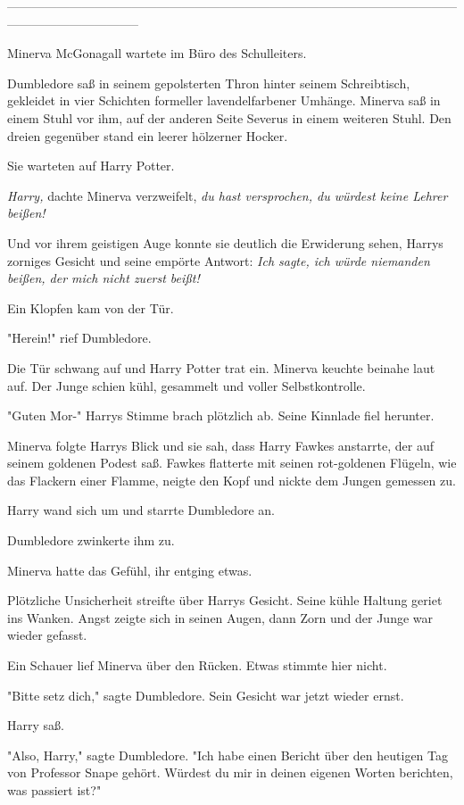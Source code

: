 {--------------------------------------------------------------------------------------------------------------------------------------------

Minerva McGonagall wartete im Büro des Schulleiters.

Dumbledore saß in seinem gepolsterten Thron hinter seinem Schreibtisch, gekleidet in vier Schichten formeller lavendelfarbener Umhänge. Minerva saß in einem Stuhl vor ihm, auf der anderen Seite Severus in einem weiteren Stuhl. Den dreien gegenüber stand ein leerer hölzerner Hocker.

Sie warteten auf Harry Potter.

\emph{Harry,} dachte Minerva verzweifelt, \emph{du hast versprochen, du würdest keine Lehrer beißen!}

Und vor ihrem geistigen Auge konnte sie deutlich die Erwiderung sehen, Harrys zorniges Gesicht und seine empörte Antwort: \emph{Ich sagte, ich würde niemanden beißen, der mich nicht zuerst beißt!}

Ein Klopfen kam von der Tür.

"Herein!" rief Dumbledore.

Die Tür schwang auf und Harry Potter trat ein. Minerva keuchte beinahe laut auf. Der Junge schien kühl, gesammelt und voller Selbstkontrolle.

"Guten Mor-" Harrys Stimme brach plötzlich ab. Seine Kinnlade fiel herunter.

Minerva folgte Harrys Blick und sie sah, dass Harry Fawkes anstarrte, der auf seinem goldenen Podest saß. Fawkes flatterte mit seinen rot-goldenen Flügeln, wie das Flackern einer Flamme, neigte den Kopf und nickte dem Jungen gemessen zu.

Harry wand sich um und starrte Dumbledore an.

Dumbledore zwinkerte ihm zu.

Minerva hatte das Gefühl, ihr entging etwas.

Plötzliche Unsicherheit streifte über Harrys Gesicht. Seine kühle Haltung geriet ins Wanken. Angst zeigte sich in seinen Augen, dann Zorn und der Junge war wieder gefasst.

Ein Schauer lief Minerva über den Rücken. Etwas stimmte hier nicht.

"Bitte setz dich," sagte Dumbledore. Sein Gesicht war jetzt wieder ernst.

Harry saß.

"Also, Harry," sagte Dumbledore. "Ich habe einen Bericht über den heutigen Tag von Professor Snape gehört. Würdest du mir in deinen eigenen Worten berichten, was passiert ist?"

}
